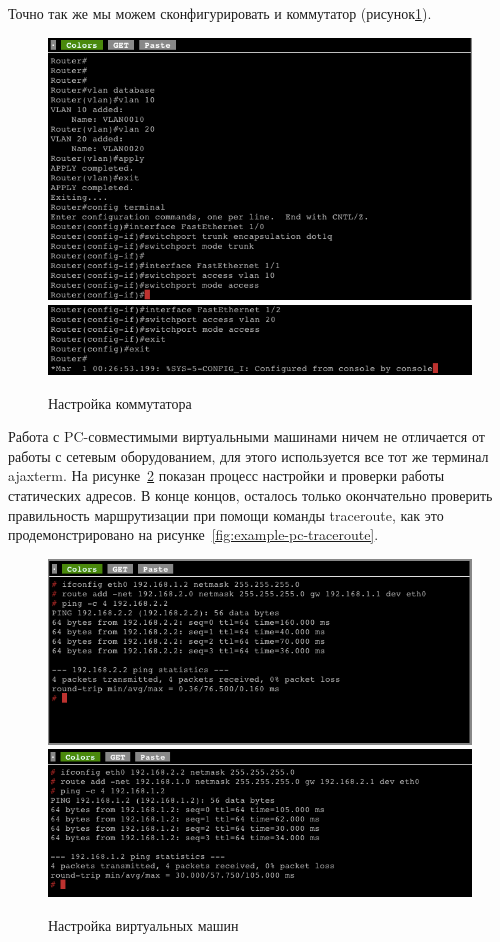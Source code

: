 Точно так же мы можем сконфигурировать и коммутатор (рисунок\ref{fig:example-switch-setup}).
\begin{figure}
  \centering
  \includegraphics[width=14cm]{fig/example-switch-setup-1.png}
  \includegraphics[width=14cm]{fig/example-switch-setup-2.png}
  \caption{Настройка коммутатора}
  \label{fig:example-switch-setup}
\end{figure}

Работа с PC-совместимыми виртуальными машинами ничем не отличается от работы с сетевым оборудованием, для этого
используется все тот же терминал ajaxterm. На рисунке~\ref{fig:example-pc-setup} показан процесс настройки и проверки работы
статических адресов. В конце концов, осталось только окончательно проверить правильность маршрутизации при помощи команды 
traceroute, как это продемонстрировано на рисунке~\ref{fig:example-pc-traceroute}.

\begin{figure}
  \centering
  \includegraphics[width=14cm]{fig/example-pc-setup-1.png}
  \includegraphics[width=14cm]{fig/example-pc-setup-2.png}
  \caption{Настройка виртуальных машин}
  \label{fig:example-pc-setup}
\end{figure}

